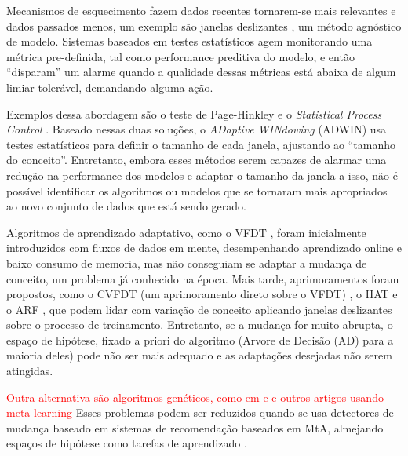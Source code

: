 Mecanismos de esquecimento fazem dados recentes tornarem-se mais relevantes e
dados passados menos, um exemplo são janelas deslizantes
\cite{gaber2005mining}, um método agnóstico de modelo.
Sistemas baseados em testes estatísticos agem monitorando uma métrica
pre-definida, tal como performance preditiva do modelo, e então ``disparam'' um
alarme quando a qualidade dessas métricas está abaixa de algum limiar
tolerável, demandando alguma ação.

Exemplos dessa abordagem são o teste de Page-Hinkley e o \textit{Statistical
Process Control} \cite{gama2010knowledge}.
Baseado nessas duas soluções, o \textit{ADaptive WINdowing} (ADWIN) \cite{bifet2007learning} usa testes estatísticos para definir o tamanho de cada janela, ajustando ao ``tamanho do conceito''.
Entretanto, embora esses métodos serem capazes de alarmar uma redução na performance dos modelos e adaptar o tamanho da janela a isso, não é possível identificar os algoritmos ou modelos que se tornaram mais apropriados ao novo conjunto de dados que está sendo gerado.

Algoritmos de aprendizado adaptativo, como o VFDT \cite{domingos2000mining},
foram inicialmente introduzidos com fluxos de dados em mente, desempenhando aprendizado online e baixo consumo de memoria, mas não conseguiam se adaptar a mudança de conceito, um problema já conhecido na época.
Mais tarde, aprimoramentos foram propostos, como o CVFDT (um aprimoramento direto sobre o VFDT) \cite{hulten2001mining}, o HAT \cite{bifet2009adaptive} e o ARF \cite{gomes2017adaptive}, que podem lidar com variação de conceito aplicando janelas deslizantes sobre o processo de treinamento.
Entretanto, se a mudança for muito abrupta, o espaço de hipótese, fixado a priori do algoritmo (Arvore de Decisão (AD) para a maioria deles) pode não ser mais adequado e as adaptações desejadas não serem atingidas.

\textcolor{red}{Outra alternativa são algoritmos genéticos, como em \cite{kanade2010evolution} e \cite{kang2017visualising} e outros artigos usando meta-learning}
Esses problemas podem ser reduzidos quando se usa detectores de mudança baseado em sistemas de recomendação baseados em MtA, almejando espaços de hipótese como tarefas de aprendizado \cite{rossi2014metastream}.

